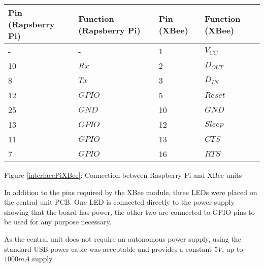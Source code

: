 \begin{center}
  \begin{tabular}{| l | l | l | l |}
    \hline
    \bf{Pin (Rapsberry Pi)} & \bf{Function (Rapsberry Pi)} & \bf{Pin (XBee)} & \bf{Function (XBee)} \\ \hline
     - & - & 1 & \(V_{CC}\) \\ \hline
	10 & \(Rx\) & 2 & \(D_{OUT}\) \\ \hline
	8 & \(Tx\) & 3 & \(D_{IN}\) \\ \hline
	12 & \(GPIO\) & 5 & \(Reset\) \\ \hline
	25 & \(GND\) & 10 & \(GND\) \\ \hline
	13 & \(GPIO\) & 12 & \(Sleep\) \\ \hline
	11 & \(GPIO\) & 13 & \(CTS\) \\ \hline
	7 & \(GPIO\) & 16 & \(RTS\) \\
    \hline
  \end{tabular}
\label{interfacePiXBee}

Figure \ref{interfacePiXBee}: Connection between Raspberry Pi and XBee units
\end{center}

In addition to the pins required by the XBee module, three LEDs were placed on the central unit PCB. One LED is connected directly to the power supply showing that the board has power, the other two are connected to GPIO pins to be used for any purpose necessary.

As the central unit does not require an autonomous power supply, using the standard USB power cable was acceptable and provides a constant $5\unit{V}$, up to $1000\unit{mA}$ supply.
